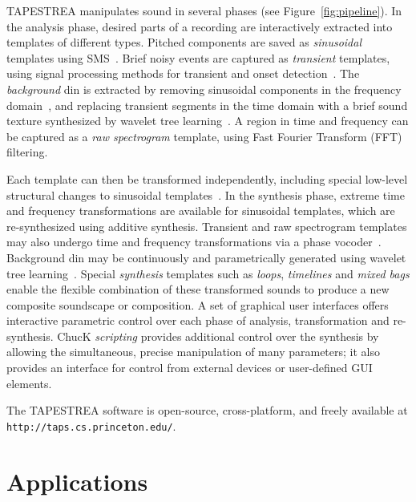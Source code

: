 \documentclass{sig-alt-release2}
\begin{document}
TAPESTREA manipulates sound in several phases 
(see Figure~\ref{fig:pipeline}). 
In the analysis phase, desired parts of a recording are interactively extracted into templates of different types. Pitched components are saved as \textit{sinusoidal} templates using SMS~\cite{McAulay86,Quatieri86,Serra89}. Brief noisy events are captured as \textit{transient} templates, using signal processing methods for transient and onset detection~\cite{Verma98,Bello05}. The \textit{background} din is extracted by removing sinusoidal components in the frequency domain~\cite{Serra89}, and replacing transient segments in the time domain with a brief sound texture synthesized by wavelet tree learning~\cite{Dubnov02}. A region in time and frequency can be captured as a \textit{raw spectrogram} template, using Fast Fourier Transform (FFT) filtering.  

Each template can then be transformed independently, including special low-level structural changes to sinusoidal templates~\cite{Lieber08}. In the synthesis phase, extreme time and frequency transformations are available for sinusoidal templates, which are re-synthesized using additive synthesis. Transient and raw spectrogram templates may also undergo time and frequency transformations via a phase vocoder~\cite{Dolson86}. Background din may be continuously and parametrically generated using wavelet tree learning~\cite{Dubnov02}. Special \textit{synthesis} templates such as \textit{loops}, \textit{timelines} and \textit{mixed bags} enable the flexible combination of these transformed sounds to produce a new composite soundscape or composition. A set of graphical user interfaces offers interactive parametric control over each phase of analysis, transformation and re-synthesis. ChucK \textit{scripting} provides additional control over the synthesis by allowing the simultaneous, precise manipulation of many parameters; it also provides an interface for control from external devices or user-defined GUI elements. 

The TAPESTREA software is open-source, cross-platform, and freely available at \texttt{http://taps.cs.princeton.edu/}.

\section{Applications}
\end{document}
